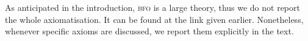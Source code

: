 \documentclass[ao]{iosart2x}
\newcommand{\nb}[1]{\textcolor{red}{$|$}\marginpar{\hspace*{-0cm}\parbox{20mm}{\scriptsize\raggedright\textcolor{red}{#1}}}}
\newcommand{\bflist}{\begin{list}{}{\setlength{\topsep}{2mm}\setlength{\parsep}{0mm}\setlength{\leftmargin}{9.2mm}\setlength{\labelwidth}{8mm}}}
\newcommand{\eflist}{\end{list}}
\newcommand{\bfoAxLabel}{\textrm{a$_\texttt{b}$}}
\newcommand{\bfoDefLabel}{\textrm{d$_\texttt{b}$}}
\newcounter{cntaxb}
\newcommand{\bfoax}[1]{\refstepcounter{cntaxb}\begin{small}{\bf \bfoAxLabel\thecntaxb\label{#1}}\end{small}}
\newcounter{cntdefb}
\newcommand{\bfodf}[1]{\refstepcounter{cntdefb}\begin{small}{\bf \bfoDefLabel\thecntdefb\label{#1}}\end{small}}
\newcounter{cntax}
\newcounter{cntdef}
\newcommand{\refbfoax}[1]{({\bfoAxLabel}\ref{#1})}
\newcommand{\refbfodf}[1]{({\bfoDefLabel}\ref{#1})}
\newcommand{\prbfo}[1]{{\textit{{#1}}}}
\newcommand{\cn}[1]{\mathtt{#1}}
\newcommand\textequal{%
 \rule[.08ex]{5pt}{0.35pt}\llap{\rule[.78ex]{5pt}{0.35pt}}}
\newcommand{\sdef}{{\hspace{1.5pt}:\hspace{-2.5pt}\textequal\hspace{3pt}}}
\newcommand{\bfo}{{\textsc{bfo}}}
\newcommand{\bfocl}{{\textsc{bfo-cl}}}
\newcommand {\thbfo} {\ensuremath{\mathfrak{B}}}
\newcommand {\thdolcedbmap} {\ensuremath{\mathfrak{D}_\texttt{b}}}
\newcommand{\idcntbcat}{\cn{idcnt}}
\newcommand{\sdcntbcat}{\cn{sdcnt}}
\newcommand{\sregbcat}{\cn{sreg}}
\newcommand{\tregbcat}{\cn{treg}}
\newcommand{\bfotime}{\textsc{tm}}
\newcommand{\bfoisa}{\prbfo{ISA}}
\newcommand{\bfocpart}{\prbfo{cP}}
\newcommand{\bfocoverlap}{\prbfo{cO}}
\newcommand{\bfoopart}{\prbfo{oP}}
\newcommand{\bfoooverlap}{\prbfo{oO}}
\newcommand{\bfotpart}{\prbfo{tP}}
\newcommand{\bfotppart}{\prbfo{tPP}}
\newcommand{\bfotoverlap}{\prbfo{tO}}
\newcommand{\bfoiof}[1]{{\,::_{#1\:\!}}}
\newcommand{\bfoinh}{\prbfo{INH}}
\newcommand{\bfosdep}{\prbfo{SDEP}}
\begin{document}
As anticipated in the introduction, {\bfo} is a large theory, thus we do not report the whole axiomatisation. It can be found at the link given earlier. Nonetheless, whenever specific axioms are discussed, we report them explicitly in the text.

% 
%
%
%
%
%
%
%
%
%
\end{document}
